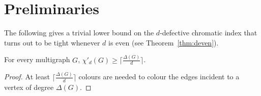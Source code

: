 
\section{Preliminaries} \label{sec:intro}

The following gives a trivial lower bound on the $d$-defective chromatic index that turns out to be tight whenever $d$ is even (see Theorem~\ref{thm:deven}). 

\begin{lemma}\label{lem:trivialbound}
For every multigraph $G$, $\chi'_{d}(G) \geq \lceil \frac{\Delta(G)}{d} \rceil$.
\end{lemma}

\begin{proof}
At least $\lceil \frac{\Delta(G)}{d} \rceil$ colours are needed to colour the edges incident to a vertex of degree $\Delta(G)$.
\end{proof}


